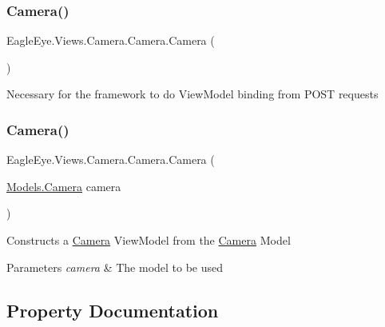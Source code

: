 \subsubsection{\texorpdfstring{Camera()}{Camera()}\hspace{0.1cm}{\footnotesize\ttfamily [1/2]}}
{\footnotesize\ttfamily Eagle\+Eye.\+Views.\+Camera.\+Camera.\+Camera (\begin{DoxyParamCaption}{ }\end{DoxyParamCaption})}



Necessary for the framework to do View\+Model binding from P\+O\+ST requests 

\mbox{\label{class_eagle_eye_1_1_views_1_1_camera_1_1_camera_a346c5d9185abc85856b4fba46edaf101}} 
\subsubsection{\texorpdfstring{Camera()}{Camera()}\hspace{0.1cm}{\footnotesize\ttfamily [2/2]}}
{\footnotesize\ttfamily Eagle\+Eye.\+Views.\+Camera.\+Camera.\+Camera (\begin{DoxyParamCaption}\item[{\mbox{\hyperlink{class_eagle_eye_1_1_models_1_1_camera}{Models.\+Camera}}}]{camera }\end{DoxyParamCaption})}



Constructs a \mbox{\hyperlink{class_eagle_eye_1_1_views_1_1_camera_1_1_camera}{Camera}} View\+Model from the \mbox{\hyperlink{class_eagle_eye_1_1_views_1_1_camera_1_1_camera}{Camera}} Model 


\begin{DoxyParams}{Parameters}
{\em camera} & The model to be used\\
\hline
\end{DoxyParams}


\subsection{Property Documentation}
\mbox{\label{class_eagle_eye_1_1_views_1_1_camera_1_1_camera_aae407995d15f660d45e7ed301146e698}} 
